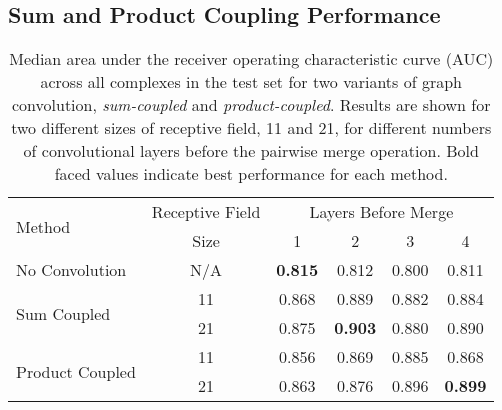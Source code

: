 \subsection{Sum and Product Coupling Performance}

\begin{table}
	\begin{center}
		\begin{tabular}{lccccc}
			\toprule
			\multirow{2}{*}{Method} &
			Receptive Field & \multicolumn{4}{c}{Layers Before Merge} \\
			& Size & 1 & {2} & {3} & {4} \\
			\midrule
			No Convolution & N/A & \textbf{0.815} & 0.812 & 0.800 & 0.811  \\\cline{1-6}
			\multirow{2}{*}{Sum Coupled} & 11 & 0.868 & 0.889 & 0.882 & 0.884 \\
			& 21 & 0.875 & \textbf{0.903} & 0.880 & 0.890 \\\cline{1-6}
			\multirow{2}{*}{Product Coupled} & 11 & 0.856 & 0.869 & 0.885 & 0.868 \\
			& 21 & 0.863 & 0.876 & 0.896 & \textbf{0.899} \\
			\bottomrule
		\end{tabular}
		\caption{Median area under the receiver operating characteristic curve (AUC) across all complexes in the test set for two variants of graph convolution, \textit{sum-coupled} and \textit{product-coupled}. Results are shown for two different sizes of receptive field, 11 and 21, for different numbers of convolutional layers before the pairwise merge operation. Bold faced values indicate best performance for each method.}
		\label{tab:med_auc}
	\end{center}
\end{table}

